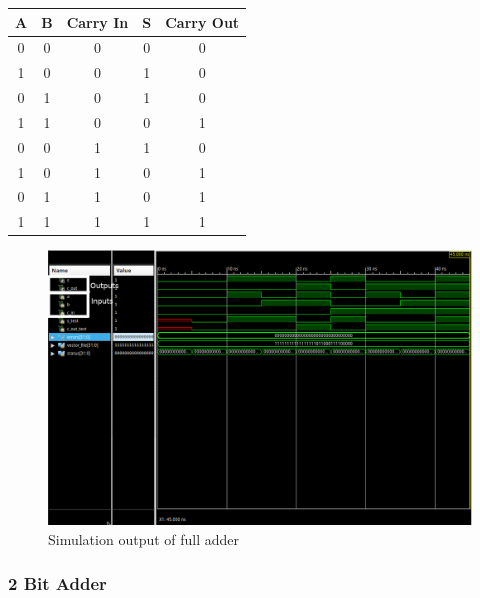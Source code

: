 \documentclass{article}
\begin{document}
    \begin{center}
        \begin{tabular}{|c|c|c||c|c|}
            \hline
            A & B & Carry In & S & Carry Out
            \\\hline\hline
            0 & 0 & 0 & 0 & 0
            \\\hline
            1 & 0 & 0 & 1 & 0
            \\\hline
            0 & 1 & 0 & 1 & 0
            \\\hline
            1 & 1 & 0 & 0 & 1
            \\\hline
            0 & 0 & 1 & 1 & 0
            \\\hline
            1 & 0 & 1 & 0 & 1
            \\\hline
            0 & 1 & 1 & 0 & 1
            \\\hline
            1 & 1 & 1 & 1 & 1
            \\\hline
        \end{tabular}
    \end{center}

    \begin{figure}[H]
        \centering
        \includegraphics[width=0.9\paperwidth,center]{Screenshots/full_adder.png}
        \caption{Simulation output of full adder}
    \end{figure}




    \subsubsection{2 Bit Adder}
\end{document}
